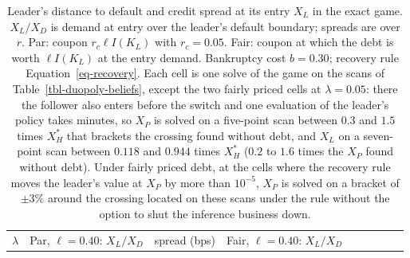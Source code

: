 \documentclass[
  11pt,
  letterpaper,
]{scrartcl}
\begin{document}
\begin{longtable}[]{@{}
  >{\raggedleft\arraybackslash}p{}
  >{\raggedleft\arraybackslash}p{}
  >{\raggedleft\arraybackslash}p{}
  >{\raggedleft\arraybackslash}p{}
  >{\raggedleft\arraybackslash}p{}
  >{\raggedleft\arraybackslash}p{}
  >{\raggedleft\arraybackslash}p{}
  >{\raggedleft\arraybackslash}p{}
  >{\raggedleft\arraybackslash}p{}@{}}
\caption{Leader's distance to default and credit spread at its entry
\(X_L\) in the exact game. \(X_L/X_D\) is demand at entry over the
leader's default boundary; spreads are over \(r\). Par: coupon
\(r_c\ell I(K_L)\) with \(r_c = 0.05\). Fair: coupon at which the debt
is worth \(\ell I(K_L)\) at the entry demand. Bankruptcy cost
\(b = 0.30\); recovery rule Equation~\ref{eq-recovery}. Each cell is one
solve of the game on the scans of Table~\ref{tbl-duopoly-beliefs},
except the two fairly priced cells at \(\lambda = 0.05\): there the
follower also enters before the switch and one evaluation of the
leader's policy takes minutes, so \(X_P\) is solved on a five-point scan
between \(0.3\) and \(1.5\) times \(X_H^*\) that brackets the crossing
found without debt, and \(X_L\) on a seven-point scan between \(0.118\)
and \(0.944\) times \(X_H^*\) (\(0.2\) to \(1.6\) times the \(X_P\)
found without debt). Under fairly priced debt, at the cells where the
recovery rule moves the leader's value at \(X_P\) by more than
\(10^{-5}\), \(X_P\) is solved on a bracket of \(\pm 3\%\) around the
crossing located on these scans under the rule without the option to
shut the inference business
down.}\label{tbl-spread-entry}\tabularnewline
\toprule\noalign{}
\begin{minipage}[b]{\linewidth}\raggedleft
\(\lambda\)
\end{minipage} & \begin{minipage}[b]{\linewidth}\raggedleft
Par, \(\ell = 0.40\): \(X_L/X_D\)
\end{minipage} & \begin{minipage}[b]{\linewidth}\raggedleft
spread (bps)
\end{minipage} & \begin{minipage}[b]{\linewidth}\raggedleft
Fair, \(\ell = 0.40\): \(X_L/X_D\)

\end{minipage}
\end{longtable}
\end{document}
